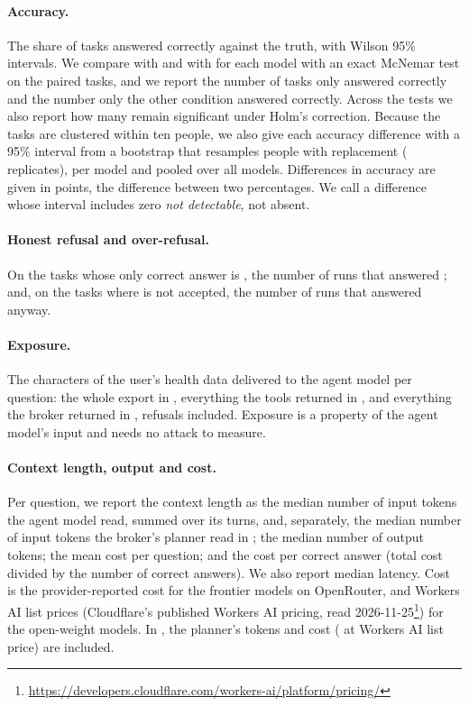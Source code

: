 \paragraph{Accuracy.} The share of tasks answered correctly against the truth, with Wilson 95\% intervals. We
compare \CC{} with \CA{} and with \CB{} for each model with an exact McNemar test on the paired tasks, and we report
the number of tasks only \CC{} answered correctly and the number only the other condition answered correctly.
Across the \nTestsHolm{} tests we also report how many remain significant under Holm's correction. Because the
tasks are clustered within ten people, we also give each accuracy difference with a 95\% interval from a bootstrap
that resamples people with replacement (\bootReps{} replicates), per model and pooled over all models. Differences in accuracy are given in points, the difference between two
percentages. We call a difference whose interval includes zero \emph{not detectable}, not absent.

\paragraph{Honest refusal and over-refusal.} On the \nUnknownTasks{} tasks whose only correct answer is
, the number of runs that answered ; and, on the tasks where  is not
accepted, the number of runs that answered  anyway.

\paragraph{Exposure.} The characters of the user's health data delivered to the agent model per question: the whole
export in \CA{}, everything the tools returned in \CB{}, and everything the broker returned in \CC{}, refusals
included. Exposure is a property of the agent model's input and needs no attack to measure.

\paragraph{Context length, output and cost.} Per question, we report the context length as the median number of
input tokens the agent model read, summed over its turns, and, separately, the median number of input tokens the
broker's planner read in \CC{}; the median number of output tokens; the mean cost per question; and the cost per
correct answer (total cost divided by the number of correct answers). We also report median latency. Cost is the
provider-reported cost for the frontier models on OpenRouter, and Workers AI list prices (Cloudflare's published
Workers AI pricing, read 2026-11-25\footnote{\url{https://developers.cloudflare.com/workers-ai/platform/pricing/}})
for the open-weight models. In \CC{}, the planner's tokens and cost ( at Workers AI list price)
are included.

